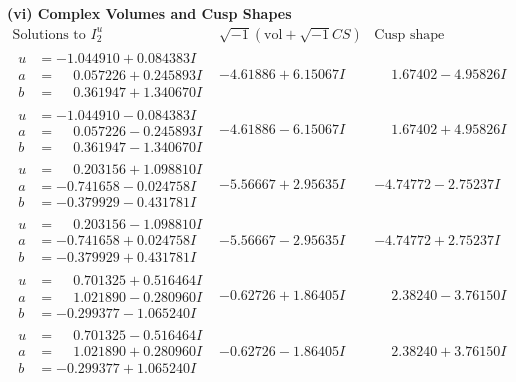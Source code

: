 \documentclass[1p]{elsarticle_modified}
\theoremstyle{definition}
\newcommand{\I}{\sqrt{-1}}
\begin{document}
\newpage\flushleft \textbf{(vi) Complex Volumes and Cusp Shapes}
$$\begin{array}{c|c|c}  
\text{Solutions to }I^u_{2}& \I (\text{vol} + \sqrt{-1}CS) & \text{Cusp shape}\\
 \hline 
\begin{aligned}
u &= -1.044910 + 0.084383 I \\
a &= \phantom{-}0.057226 + 0.245893 I \\
b &= \phantom{-}0.361947 + 1.340670 I\end{aligned}
 & -4.61886 + 6.15067 I & \phantom{-}1.67402 - 4.95826 I \\ \hline\begin{aligned}
u &= -1.044910 - 0.084383 I \\
a &= \phantom{-}0.057226 - 0.245893 I \\
b &= \phantom{-}0.361947 - 1.340670 I\end{aligned}
 & -4.61886 - 6.15067 I & \phantom{-}1.67402 + 4.95826 I \\ \hline\begin{aligned}
u &= \phantom{-}0.203156 + 1.098810 I \\
a &= -0.741658 - 0.024758 I \\
b &= -0.379929 - 0.431781 I\end{aligned}
 & -5.56667 + 2.95635 I & -4.74772 - 2.75237 I \\ \hline\begin{aligned}
u &= \phantom{-}0.203156 - 1.098810 I \\
a &= -0.741658 + 0.024758 I \\
b &= -0.379929 + 0.431781 I\end{aligned}
 & -5.56667 - 2.95635 I & -4.74772 + 2.75237 I \\ \hline\begin{aligned}
u &= \phantom{-}0.701325 + 0.516464 I \\
a &= \phantom{-}1.021890 - 0.280960 I \\
b &= -0.299377 - 1.065240 I\end{aligned}
 & -0.62726 + 1.86405 I & \phantom{-}2.38240 - 3.76150 I \\ \hline\begin{aligned}
u &= \phantom{-}0.701325 - 0.516464 I \\
a &= \phantom{-}1.021890 + 0.280960 I \\
b &= -0.299377 + 1.065240 I\end{aligned}
 & -0.62726 - 1.86405 I & \phantom{-}2.38240 + 3.76150 I \\ \hline\begin{aligned}

\end{aligned}
\end{array}$$
\end{document}
